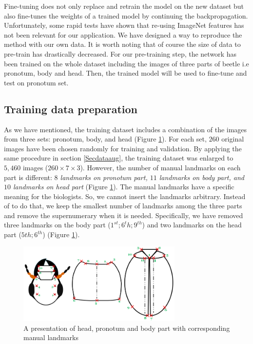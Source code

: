 \documentclass{article} %
\begin{document}
\begin{multicols}{2}
Fine-tuning does not only replace and retrain the model on the new
dataset but also fine-tunes the weights of a trained model by continuing the
backpropagation. Unfortunately, some rapid tests have shown that
re-using ImageNet features has not been relevant for our
application. We have designed a way to reproduce the method with our
own data. It is worth noting that of course the size of data to pre-train has drastically decreased. For our pre-training step, the network has been trained on the whole dataset including the images of three parts of beetle i.e pronotum, body and head. Then,
the trained model will be used to fine-tune and test on pronotum set.

\subsection{Training data preparation}
As we have mentioned, the training dataset includes a combination of the images from three
sets: pronotum, body, and head (Figure \ref{figshape3parts}). For each
set, $260$ original images have been chosen randomly for training and
validation. By applying the same procedure in section \ref{Secdataaug},
the training dataset was enlarged to $5,460$ images ($260 \times 7
\times 3$). However, the number of manual landmarks on each part is
different: \textit{$8$ landmarks on pronotum part, $11$ landmarks on
  body part, and $10$ landmarks on head part} (Figure \ref{figshape3parts}). The manual landmarks
have a specific meaning for the biologists. So, we cannot insert the
landmarks arbitrary. Instead of to do that, we keep the smallest number of
landmarks among the three parts and remove the supernumerary when it is needed. Specifically, we have removed three landmarks on the body part
($1^{st}; 6^{t}h; 9^{th}$) and two landmarks on the head part ($5{th};
6^{th}$) (Figure \ref{figshape3parts}).

\begin{figure}[H]
        \centering
        \includegraphics[height=1.6in]{images/merge.png}
    \caption{\footnotesize{A presentation of head, pronotum and body part with corresponding manual landmarks}} 
    \label{figshape3parts}
\end{figure}


\end{multicols}
\end{document}
